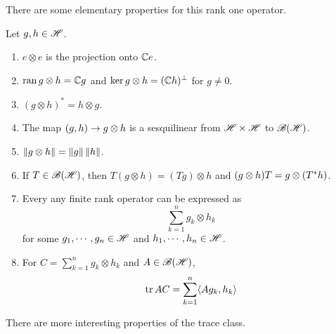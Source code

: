 There are some elementary properties for this rank one operator.
\begin{prop}
	Let $g,h \in \mathscr{H}$.
	\begin{enumerate}[label=\arabic*)]
		\item $e \otimes e$ is the projection onto $\mathbb{C} e$.
		\item $\operatorname{ran}{g \otimes h} = \mathbb{C} g$ and $\ker{g \otimes h} = (\mathbb{C} h)^{\bot}$ for $g \neq 0$.
		\item $(g \otimes h)^{*} = h \otimes g$.
		\item The map $(g,h) \rightarrow g \otimes h$ is a sesquilinear from $\mathscr{H} \times \mathscr{H}$ to $\mathscr{B(H)}$.
		\item $\left\lVert g \otimes h\right\lVert = \left\lVert g\right\lVert \left\lVert h\right\lVert$.
		\item If $T \in \mathscr{B(H)}$, then $T(g \otimes h) = (Tg) \otimes h$ and $(g \otimes h) T = g \otimes (T^{*}h)$.
		\item Every any finite rank operator can be expressed as
		\begin{equation*}
			\sum_{k=1}^{n} g_k \otimes h_k
		\end{equation*}
		for some $g_1, \cdots, g_n \in \mathscr{H}$ and $h_1, \cdots, h_n \in \mathscr{H}$.
		\item For $C = \sum_{k=1}^n g_k \otimes h_k$ and $A \in \mathscr{B(H)}$,
		\begin{equation*}
			\operatorname{tr}{AC} = \sum_{k=1}^n \langle Ag_k,h_k \rangle
		\end{equation*}
	\end{enumerate}
\end{prop}

There are more interesting properties of the trace class.

